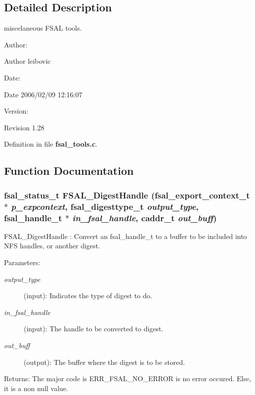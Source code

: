 \subsection{Detailed Description}
miscelaneous FSAL tools. 

\begin{Desc}
\item[Author:]\begin{Desc}
\item[Author]leibovic \end{Desc}
\end{Desc}
\begin{Desc}
\item[Date:]\begin{Desc}
\item[Date]2006/02/09 12:16:07 \end{Desc}
\end{Desc}
\begin{Desc}
\item[Version:]\begin{Desc}
\item[Revision]1.28 \end{Desc}
\end{Desc}


Definition in file {\bf fsal\_\-tools.c}.

\subsection{Function Documentation}
\subsubsection{\setlength{\rightskip}{0pt plus 5cm}fsal\_\-status\_\-t FSAL\_\-Digest\-Handle (fsal\_\-export\_\-context\_\-t $\ast$ {\em p\_\-expcontext}, fsal\_\-digesttype\_\-t {\em output\_\-type}, fsal\_\-handle\_\-t $\ast$ {\em in\_\-fsal\_\-handle}, caddr\_\-t {\em out\_\-buff})}\label{fsal__tools_8c_a8}


FSAL\_\-Digest\-Handle : Convert an fsal\_\-handle\_\-t to a buffer to be included into NFS handles, or another digest.

\begin{Desc}
\item[Parameters:]
\begin{description}
\item[{\em output\_\-type}](input): Indicates the type of digest to do. \item[{\em in\_\-fsal\_\-handle}](input): The handle to be converted to digest. \item[{\em out\_\-buff}](output): The buffer where the digest is to be stored.\end{description}
\end{Desc}
\begin{Desc}
\item[Returns:]The major code is ERR\_\-FSAL\_\-NO\_\-ERROR is no error occured. Else, it is a non null value. \end{Desc}


